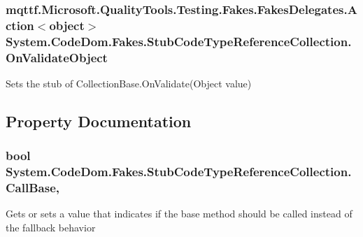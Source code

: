 \hypertarget{class_system_1_1_code_dom_1_1_fakes_1_1_stub_code_type_reference_collection_a6106b624e82170c45e20b1232fd4124a}{
\subsubsection[{On\-Validate\-Object}]{\setlength{\rightskip}{0pt plus 5cm}mqttf.\-Microsoft.\-Quality\-Tools.\-Testing.\-Fakes.\-Fakes\-Delegates.\-Action$<$object$>$ System.\-Code\-Dom.\-Fakes.\-Stub\-Code\-Type\-Reference\-Collection.\-On\-Validate\-Object}}\label{class_system_1_1_code_dom_1_1_fakes_1_1_stub_code_type_reference_collection_a6106b624e82170c45e20b1232fd4124a}


Sets the stub of Collection\-Base.\-On\-Validate(\-Object value)



\subsection{Property Documentation}
\hypertarget{class_system_1_1_code_dom_1_1_fakes_1_1_stub_code_type_reference_collection_a25f68abfbb23bc54346a668f58faed6d}{
\subsubsection[{Call\-Base}]{\setlength{\rightskip}{0pt plus 5cm}bool System.\-Code\-Dom.\-Fakes.\-Stub\-Code\-Type\-Reference\-Collection.\-Call\-Base\hspace{0.3cm}{\ttfamily [get]}, {\ttfamily [set]}}}\label{class_system_1_1_code_dom_1_1_fakes_1_1_stub_code_type_reference_collection_a25f68abfbb23bc54346a668f58faed6d}


Gets or sets a value that indicates if the base method should be called instead of the fallback behavior

